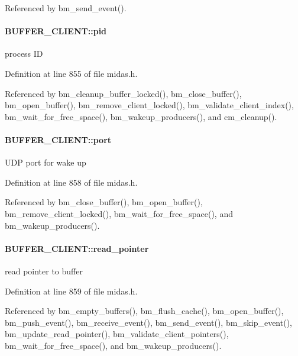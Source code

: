 Referenced by bm\_\-send\_\-event().
\paragraph[{pid}]{ {\bf BUFFER\_\-CLIENT::pid}}\hfill\label{structBUFFER__CLIENT_a44911884d209e2a4f90fb02033d8cb94}
process ID 

Definition at line 855 of file midas.h.

Referenced by bm\_\-cleanup\_\-buffer\_\-locked(), bm\_\-close\_\-buffer(), bm\_\-open\_\-buffer(), bm\_\-remove\_\-client\_\-locked(), bm\_\-validate\_\-client\_\-index(), bm\_\-wait\_\-for\_\-free\_\-space(), bm\_\-wakeup\_\-producers(), and cm\_\-cleanup().
\paragraph[{port}]{ {\bf BUFFER\_\-CLIENT::port}}\hfill\label{structBUFFER__CLIENT_ad8112ed9dd177230ff2a9acfd84c5429}
UDP port for wake up 

Definition at line 858 of file midas.h.

Referenced by bm\_\-close\_\-buffer(), bm\_\-open\_\-buffer(), bm\_\-remove\_\-client\_\-locked(), bm\_\-wait\_\-for\_\-free\_\-space(), and bm\_\-wakeup\_\-producers().
\paragraph[{read\_\-pointer}]{ {\bf BUFFER\_\-CLIENT::read\_\-pointer}}\hfill\label{structBUFFER__CLIENT_ae0c5c3a62b9dac568d8f45cf4bc951ab}
read pointer to buffer 

Definition at line 859 of file midas.h.

Referenced by bm\_\-empty\_\-buffers(), bm\_\-flush\_\-cache(), bm\_\-open\_\-buffer(), bm\_\-push\_\-event(), bm\_\-receive\_\-event(), bm\_\-send\_\-event(), bm\_\-skip\_\-event(), bm\_\-update\_\-read\_\-pointer(), bm\_\-validate\_\-client\_\-pointers(), bm\_\-wait\_\-for\_\-free\_\-space(), and bm\_\-wakeup\_\-producers().
